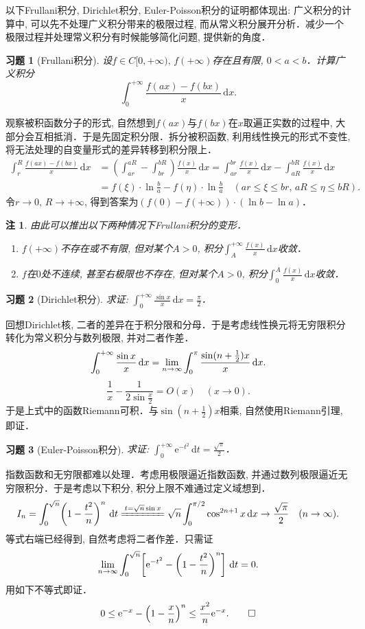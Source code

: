 \documentclass[11pt,a4paper]{ctexart}
\makeatletter
\theoremstyle{thmseries} %
\theoremstyle{exerseries}
\newtheorem{exer}{习题}[section]
\newtheorem*{rem}{注}
\renewenvironment{proof}[1][\proofname]{\par
  \pushQED{\qed}%
  \normalfont \topsep6\p@\@plus6\p@\relax
  \trivlist
  \item[\hskip\labelsep
        \itshape
    #1\@addpunct{}]\ignorespaces
}{%
  \popQED\endtrivlist\@endpefalse
}
\newenvironment{sol}{\begin{proof}[\bfseries\upshape 解\quad]}{\end{proof}}
\newenvironment{pf}{\begin{proof}[\bfseries\upshape 证\quad]}{\end{proof}}
\newcommand{\bra}[1]{\mathopen{}\left(#1\right)}
\newcommand{\sbra}[1]{\mathopen{}\left[#1\right]}
\renewcommand{\d}{\mathrm{d}}
\newcommand{\e}{\mathrm{e}}
\def \nti {\mathnormal{n}\to\infty}
\makeatother
\begin{document}
以下Frullani积分, Dirichlet积分, Euler-Poisson积分的证明都体现出: 广义积分的计算中, 可以先不处理广义积分带来的极限过程, 而从常义积分展开分析．减少一个极限过程并处理常义积分有时候能够简化问题, 提供新的角度．
\begin{exer}[Frullani积分]
	设$f\in C[0,+\infty),\,f(+\infty)$存在且有限, $0<a<b$．计算广义积分
	\[\int_{0}^{+\infty}\frac{f(ax)-f(bx)}{x}\,\d x.\]
\end{exer}
\begin{sol}
	观察被积函数分子的形式, 自然想到$f(ax)$与$f(bx)$在$x$取遍正实数的过程中, 大部分会互相抵消．于是先固定积分限．拆分被积函数, 利用线性换元的形式不变性, 将无法处理的自变量形式的差异转移到积分限上．
	\begin{align*}
		\int_{r}^{R}\frac{f(ax)-f(bx)}{x}\,\d x&=\bra{\int_{ar}^{aR}-\int_{br}^{bR}}\frac{f(x)}{x}\,\d x=\int_{ar}^{br}\frac{f(x)}{x}\,\d x-\int_{aR}^{bR}\frac{f(x)}{x}\,\d x\\
		&=f(\xi)\cdot\ln\frac{b}{a}-f(\eta)\cdot\ln\frac{b}{a}\quad (ar\leq\xi\leq br,\,aR\leq\eta\leq bR).
	\end{align*}
	令$r\to0,\,R\to+\infty$, 得到答案为$\bra{f(0)-f(+\infty)}\cdot(\ln b-\ln a)$．
\end{sol}
\begin{rem}
	由此可以推出以下两种情况下Frullani积分的变形．
	\begin{enumerate}
		\item $f(+\infty)$不存在或不有限, 但对某个$A>0$, 积分$\int_{A}^{+\infty}\frac{f(x)}{x}\,\d x$收敛．
		\item $f$在$0$处不连续, 甚至右极限也不存在, 但对某个$A>0$, 积分$\int_{0}^{A}\frac{f(x)}{x}\,\d x$收敛．
	\end{enumerate}
\end{rem}

\begin{exer}[Dirichlet积分]
	求证: $\int_{0}^{+\infty}\frac{\sin x}{x}\,\d x=\frac{\pi}{2}$．
\end{exer}
\begin{pf}
	回想Dirichlet核, 二者的差异在于积分限和分母．于是考虑线性换元将无穷限积分转化为常义积分与数列极限, 并对二者作差．
	\[\int_{0}^{+\infty}\frac{\sin x}{x}\,\d x=\lim_{\nti}\int_{0}^{\pi}\frac{\sin(n+\frac{1}{2})x}{x}\,\d x.\]
	\[\frac{1}{x}-\frac{1}{2\sin\frac{x}{2}}=O(x)\quad(x\to0).\]
	于是上式中的函数Riemann可积．与$\sin(n+\frac{1}{2})x$相乘, 自然使用Riemann引理, 即证．
\end{pf}

\begin{exer}[Euler-Poisson积分]
	求证: $\int_{0}^{+\infty}\e^{-t^2}\,\d t=\frac{\sqrt{\pi}}{2}$．
\end{exer}
\begin{pf}
	指数函数和无穷限都难以处理．考虑用极限逼近指数函数, 并通过数列极限逼近无穷限积分．于是考虑以下积分, 积分上限不难通过定义域想到．
	\[I_n=\int_{0}^{\sqrt{n}}\bra{1-\frac{t^2}{n}}^n\,\d t\xlongequal{t=\sqrt{n}\sin x}\sqrt{n}\int_{0}^{\pi/2}\cos^{2n+1}x\,\d x\to\frac{\sqrt{\pi}}{2}\quad(\nti).\]
	等式右端已经得到, 自然考虑将二者作差．只需证
	\[\lim_{\nti}\int_{0}^{\sqrt{n}}\sbra{\e^{-t^2}-\bra{1-\frac{t^2}{n}}^n}\,\d t=0.\]
	用如下不等式即证．
	\[0\leq\e^{-x}-\bra{1-\frac{x}{n}}^n\leq\frac{x^2}{n}\e^{-x}.\qedhere\]
\end{pf}
\end{document}
